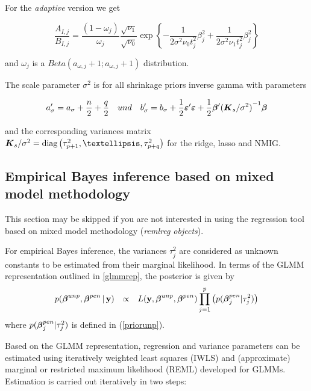 \documentclass[11pt,a4paper,twoside]{bayesxarticle}
\begin{document}
For the {\em adaptive} version  we get

\[\frac{A_{I,j} }{B_{I,j} } =\frac{\left(1-\omega_j \right)}{\omega_j } \frac{\sqrt{
\nu _{1} } }{\sqrt{\nu _{0} } } \exp \left\{-\frac{1}{2\sigma^2 \nu _{0} t_{j}^{2} } \beta
_{j}^{2} +\frac{1}{2\sigma^2 \nu _{1} t_{j}^{2} } \beta _{j}^{2} \right\}\]

and $\omega_j $ is a $Beta\left(a_{\omega,j}+1 ;a_{\omega,j}+1 \right)$ distribution.

The scale parameter $\sigma ^{2} $ is for all shrinkage priors inverse
gamma with parameters

\[a'_{\sigma } =a_{\sigma } +\frac{n}{2} +\frac{q}{2} \quad und\quad b'_{\sigma }
=b_{\sigma } +\frac{1}{2} \boldsymbol{\varepsilon}'\boldsymbol{\varepsilon} +\frac{1}{2} \boldsymbol{\beta}'{(\mbox{\boldmath $K$}_{s}/\sigma^2)}^{-1}
\boldsymbol{\beta}\]

and the corresponding variances matrix $\mK_{s}/ \sigma^2 = \diag\left(\tau _{p+1}^{2} ,\ldots,\tau _{p+q}^{2} \right)$ for the ridge, lasso and NMIG.


\subsection{Empirical Bayes inference based on mixed model methodology}
\label{glmmmeth}

This section may be skipped if you are not interested in using the
regression tool based on mixed model methodology ({\em remlreg
objects}).

For empirical Bayes inference, the variances $\tau^2_j$ are
considered as unknown constants to be estimated from their marginal
likelihood. In terms of the GLMM representation outlined in
\autoref{glmmrep}, the posterior is given by
\begin{equation}
\label{posterior2}
\begin{array}{lll}
 p(\betavec^{unp},\betavec^{pen}\, | \, \yvec) & \propto & L( \yvec,\betavec^{unp},\betavec^{pen})
\displaystyle \prod_{j=1}^p \left( p(\betavec_j^{pen}|\tau_j^2)  \right) \\
 \end{array}
\end{equation}
where $p(\boldsymbol{\beta}_j^{pen}|\tau_j^2)$ is defined in (\ref{priorunp}).

Based on the GLMM representation, regression and variance parameters
can be estimated using iteratively weighted least squares (IWLS) and
(approximate) marginal or restricted maximum likelihood (REML)
developed for GLMMs. Estimation is carried out iteratively in two
steps:
\end{document}
